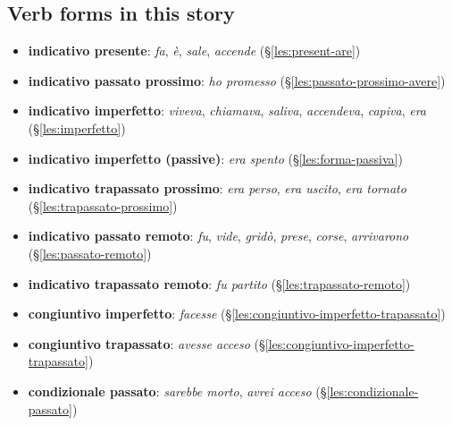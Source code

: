 \documentclass[11pt,a4paper,twoside,openright]{book}
\begin{document}
\subsection*{Verb forms in this story}
\begin{itemize}
\item\relax \textbf{indicativo presente}: \textit{fa}, \textit{è}, \textit{sale}, \textit{accende} (\S\ref{les:present-are})
\item\relax \textbf{indicativo passato prossimo}: \textit{ho promesso} (\S\ref{les:passato-prossimo-avere})
\item\relax \textbf{indicativo imperfetto}: \textit{viveva}, \textit{chiamava}, \textit{saliva}, \textit{accendeva}, \textit{capiva}, \textit{era} (\S\ref{les:imperfetto})
\item\relax \textbf{indicativo imperfetto (passive)}: \textit{era spento} (\S\ref{les:forma-passiva})
\item\relax \textbf{indicativo trapassato prossimo}: \textit{era perso}, \textit{era uscito}, \textit{era tornato} (\S\ref{les:trapassato-prossimo})
\item\relax \textbf{indicativo passato remoto}: \textit{fu}, \textit{vide}, \textit{gridò}, \textit{prese}, \textit{corse}, \textit{arrivarono} (\S\ref{les:passato-remoto})
\item\relax \textbf{indicativo trapassato remoto}: \textit{fu partito} (\S\ref{les:trapassato-remoto})
\item\relax \textbf{congiuntivo imperfetto}: \textit{facesse} (\S\ref{les:congiuntivo-imperfetto-trapassato})
\item\relax \textbf{congiuntivo trapassato}: \textit{avesse acceso} (\S\ref{les:congiuntivo-imperfetto-trapassato})
\item\relax \textbf{condizionale passato}: \textit{sarebbe morto}, \textit{avrei acceso} (\S\ref{les:condizionale-passato})
\end{itemize}
\end{document}
